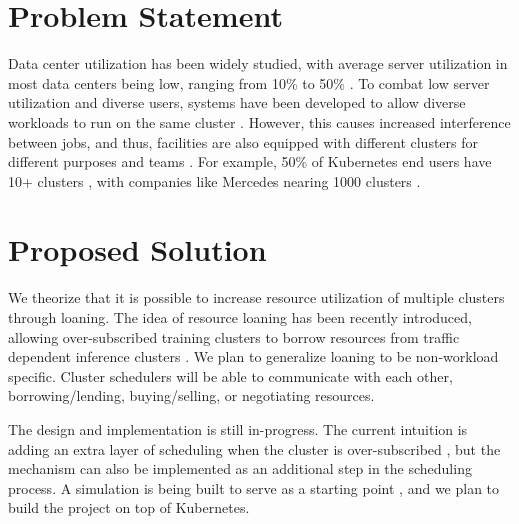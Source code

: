 \section{Problem Statement}
Data center utilization has been widely studied, with average server utilization in most data centers being low, 
ranging from 10\% to 50\%
\cite{lo_heracles_2015}. 
To combat low server utilization and diverse users, systems have been developed to allow diverse workloads to run 
on the same cluster \cite{bhattacharya_hierarchical_2013, hindman_mesos_nodate}. 
However, this causes increased interference between jobs, and thus, 
facilities are also equipped with different clusters for different purposes and teams \cite{patel_what_2022, li_lyra_2023}. 
For example, 50\% of Kubernetes \cite{verma_large-scale_2015}
end users have 10+ clusters \cite{noauthor_cncf_2023} 
, with companies like Mercedes nearing 1000 clusters \cite{noauthor_mercedes-benz_2023}.

\section{Proposed Solution}
We theorize that it is possible to increase resource utilization of multiple clusters through loaning. 
The idea of resource loaning has been recently introduced, allowing over-subscribed training clusters to 
borrow resources from traffic dependent inference clusters \cite{li_lyra_2023}.
We plan to generalize loaning to be non-workload specific. Cluster schedulers will be able to communicate 
with each other, borrowing/lending, buying/selling, or negotiating resources.
\newline

\noindent The design and implementation is still in-progress. The current intuition is adding an extra layer 
of scheduling when the cluster is over-subscribed \cite{zaharia_delay_2010}, but the mechanism can also be implemented 
as an additional step in the scheduling process. A simulation is being built to serve as a starting point \cite{sched-github}, 
and we plan to build the project on top of Kubernetes.

